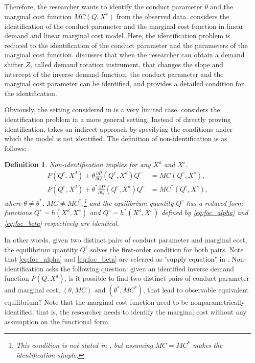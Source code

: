 \documentclass[11pt, a4paper]{article}
\newtheorem{definition}{Definition}
\theoremstyle{remark}
\begin{document}
Therefore, the researcher wants to identify the conduct parameter $\theta$ and the marginal cost function $MC(Q, X^{s})$ from the observed data.
\cite{bresnahan1982oligopoly} considers the identification of the conduct parameter and the marginal cost function in linear demand and linear marginal cost model.
Here, the identification problem is reduced to the identification of the conduct parameter and the parameters of the marginal cost function.
\citet{bresnahan1982oligopoly} discusses that when the researcher can obtain a demand shifter $Z$, called demand rotation instrument, that changes the slope and intercept of the inverse demand function, the conduct parameter and the marginal cost parameter can be identified, and \citet{matsumura2023resolving} provides a detailed condition for the identification.


Obviously, the setting considered in \citet{bresnahan1982oligopoly} is a very limited case.
\citet{lau1982identifying} considers the identification problem in a more general setting.
Instead of directly proving identification, \citet{lau1982identifying} takes an indirect approach by specifying the conditions under which the model is not identified. 
The definition of non-identification is as follows:
\begin{framed}
    \begin{definition}\label{def:non_identification}
    Non-identification implies for any $X^{d}$ and $X^{s}$,
    \begin{align}
    P(Q^e, X^{d}) + \theta \frac{\partial P}{\partial Q}(Q^e, X^{d})Q^e &= MC(Q^e, X^{s}),  \label{eq:foc_alpha}\\
    P(Q^e, X^{d}) + \theta^{*} \frac{\partial P}{\partial Q}(Q^e, X^{d})Q^e &= MC^{*}(Q^e, X^{s}),\label{eq:foc_beta}
    \end{align}
    where $\theta \neq \theta^{*}$, $MC \ne MC^{*}$,\footnote{This condition is not stated in \citet{lau1982identifying}, but assuming $MC = MC^{*}$ makes the identification simple.} and the equilibrium quantity $Q^e$ has a reduced form functions $Q^e = h(X^{d}, X^{s})$ and $Q^e = h^{*}(X^{d}, X^{s})$ defined by \eqref{eq:foc_alpha} and \eqref{eq:foc_beta} respectively are identical.
    \end{definition}
\end{framed}
In other words, given two distinct pairs of conduct parameter and marginal cost, the equilibrium quantity $Q^e$ solves the first-order condition for both pairs.
Note that \eqref{eq:foc_alpha} and \eqref{eq:foc_beta} are referred as "supply equation" in \citet{bresnahan1982oligopoly}.
Non-identification asks the following question: given an identified inverse demand function $P(Q, X^{d})$, is it possible to find two distinct pairs of conduct parameter and marginal cost, $(\theta, MC)$ and $(\theta^{*}, MC^{*})$, that lead to observable equivalent equilibrium?
Note that the marginal cost function need to be nonparametrically identified; that is, the researcher needs to identify the marginal cost without any assumption on the functional form.
\end{document}
